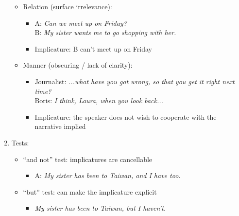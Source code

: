 \documentclass[12pt, a4paper]{article}
\begin{document}
\begin{multicols*}{3}
\begin{enumerate}[\roman*.]
\begin{itemize}[leftmargin=*]
      \item Relation (surface irrelevance):
        \begin{itemize}[leftmargin=*]\vspace{2pt}
          \item A: \textit{Can we meet up on Friday?}\\
                B: \textit{My sister wants me to go shopping with her.}
          \item Implicature: B can't meet up on Friday
        \end{itemize}
      \item Manner (obscuring / lack of clarity):
        \begin{itemize}[leftmargin=*]\vspace{2pt}
          \item Journalist: \textit{...what have you got wrong, so that you get it right next time?}\\
                Boris: \textit{I think, Laura, when you look back...}
          \item Implicature: the speaker does not wish to cooperate with the narrative implied
        \end{itemize}
    \end{itemize}
  \item Tests:
    \begin{itemize}[leftmargin=*]\vspace{3pt}
      \item ``and not'' test: implicatures are cancellable
        \begin{itemize}[leftmargin=*]\vspace{2pt}
          \item A: \textit{My sister has been to Taiwan, and I have too.}
        \end{itemize}
      \item ``but'' test: can make the implicature explicit
        \begin{itemize}[leftmargin=*]\vspace{2pt}
          \item \textit{My sister has been to Taiwan, but I haven't.}
        \end{itemize}
    \end{itemize}
\end{enumerate}
\colbreak


\end{multicols*}
\end{document}
